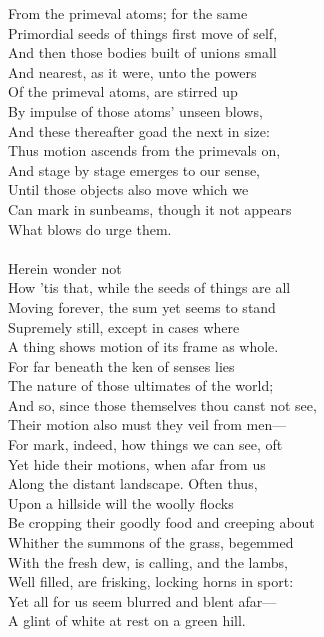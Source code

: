 From the primeval atoms; for the same\\
Primordial seeds of things first move of self,\\
And then those bodies built of unions small\\
And nearest, as it were, unto the powers\\
Of the primeval atoms, are stirred up\\
By impulse of those atoms' unseen blows,\\
And these thereafter goad the next in size:\\
Thus motion ascends from the primevals on,\\
And stage by stage emerges to our sense,\\
Until those objects also move which we\\
Can mark in sunbeams, though it not appears\\
What blows do urge them.\\
\\
Herein wonder not\\
How 'tis that, while the seeds of things are all\\
Moving forever, the sum yet seems to stand\\
Supremely still, except in cases where\\
A thing shows motion of its frame as whole.\\
For far beneath the ken of senses lies\\
The nature of those ultimates of the world;\\
And so, since those themselves thou canst not see,\\
Their motion also must they veil from men—\\
For mark, indeed, how things we can see, oft\\
Yet hide their motions, when afar from us\\
Along the distant landscape. Often thus,\\
Upon a hillside will the woolly flocks\\
Be cropping their goodly food and creeping about\\
Whither the summons of the grass, begemmed\\
With the fresh dew, is calling, and the lambs,\\
Well filled, are frisking, locking horns in sport:\\
Yet all for us seem blurred and blent afar—\\
A glint of white at rest on a green hill.\\
